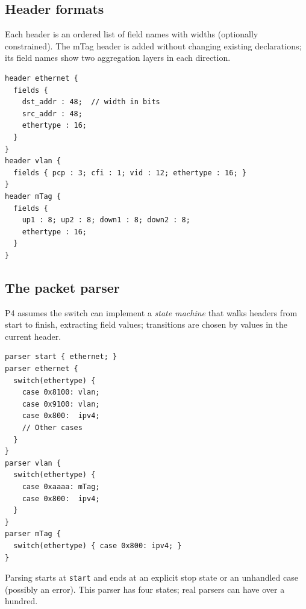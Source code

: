 \subsection{Header formats}
Each header is an ordered list of field names with widths (optionally constrained). The mTag header is added without changing existing declarations; its field names show two aggregation layers in each direction.
\begin{lstlisting}
header ethernet {
  fields {
    dst_addr : 48;  // width in bits
    src_addr : 48;
    ethertype : 16;
  }
}
header vlan {
  fields { pcp : 3; cfi : 1; vid : 12; ethertype : 16; }
}
header mTag {
  fields {
    up1 : 8; up2 : 8; down1 : 8; down2 : 8;
    ethertype : 16;
  }
}
\end{lstlisting}

\subsection{The packet parser}
P4 assumes the switch can implement a \emph{state machine} that walks headers from start to finish, extracting field values; transitions are chosen by values in the current header.  
\begin{lstlisting}
parser start { ethernet; }
parser ethernet {
  switch(ethertype) {
    case 0x8100: vlan;
    case 0x9100: vlan;
    case 0x800:  ipv4;
    // Other cases
  }
}
parser vlan {
  switch(ethertype) {
    case 0xaaaa: mTag;
    case 0x800:  ipv4;
  }
}
parser mTag {
  switch(ethertype) { case 0x800: ipv4; }
}
\end{lstlisting}
Parsing starts at \texttt{start} and ends at an explicit stop state or an unhandled case (possibly an error). This parser has four states; real parsers can have over a hundred.

